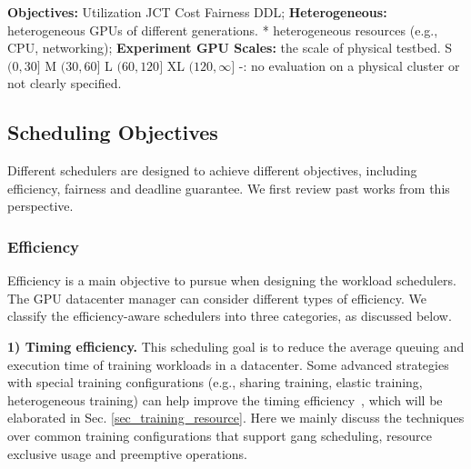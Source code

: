 \begin{table}[t]
    \begin{flushleft}
        \begin{tablenotes}
            \scriptsize
            \textbf{Objectives:}  Utilization  JCT  Cost  Fairness  DDL; \hspace{10pt} \textbf{Heterogeneous:}   heterogeneous GPUs of different generations. * heterogeneous resources (e.g., CPU, networking); \hspace{10pt}  \textbf{Experiment GPU Scales:} the scale of physical testbed. S $(0, 30]$ M $(30, 60]$ L $(60, 120]$ XL $(120, \infty]$ -: no evaluation on a physical cluster or not clearly specified.
        \end{tablenotes}
    \end{flushleft}
    \vspace{-15pt}
    \label{tab_training}
\end{table}


\subsection{Scheduling Objectives}
Different schedulers are designed to achieve different objectives, including efficiency, fairness and deadline guarantee. We first review past works from this perspective.


\subsubsection{Efficiency}
\label{sec_training_efficiency}
Efficiency is a main objective to pursue when designing the workload schedulers. The GPU datacenter manager can consider different types of efficiency. We classify the efficiency-aware schedulers into three categories, as discussed below.

\textbf{1) Timing efficiency.} This scheduling goal is to reduce the average queuing and execution time of training workloads in a datacenter. Some advanced strategies with special training configurations (e.g., sharing training, elastic training, heterogeneous training) can help improve the timing efficiency~\cite{Gandiva,Antman,JIGSAW,ELAN,EDL,AFS,Pollux,Aryl}, which will be elaborated in Sec. \ref{sec_training_resource}. Here we mainly discuss the techniques over common training configurations that support gang scheduling, resource exclusive usage and preemptive operations.


